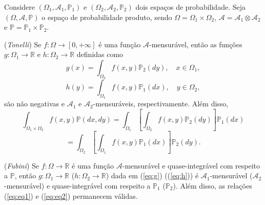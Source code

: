 \begin{theorem}
	Considere $(\Omega_1, \mathcal{A}_1, \mathbb{P}_1)$ e $(\Omega_2, \mathcal{A}_2, \mathbb{P}_2)$ dois espaços de probabilidade. Seja $(\Omega, \mathcal{A}, \mathbb{P})$ o espaço de probabilidade produto, sendo $\Omega = \Omega_1 \times \Omega_2$, $\mathcal{A} = \mathcal{A}_1 \otimes \mathcal{A}_2$ e $\mathbb{P} = \mathbb{P}_1 \times \mathbb{P}_2$.
	
	\begin{outline}
		\1[(a)](\textit{Tonelli}) Se $f : \Omega \rightarrow [0, +\infty]$ é uma função $\mathcal{A}$-mensurável, então as funções $g : \Omega_1 \rightarrow \mathbb{R}$ e $h : \Omega_2 \rightarrow \mathbb{R}$ definidas como
		\begin{equation}\label{eq:g}
			g(x) = \int_{\Omega_2} f(x, y)\mathbb{P}_2(dy), \quad x \in \Omega_1,
		\end{equation}
		\begin{equation}\label{eq:h}
			h(y) = \int_{\Omega_1} f(x, y)\mathbb{P}_1(dx), \quad y \in \Omega_2,
		\end{equation}
		são não negativas e $\mathcal{A}_1$ e $\mathcal{A}_2$-mensuráveis, respectivamente. Além disso,
		\begin{equation}\label{eq:eq1}
			\int_{\Omega_1 \times \Omega_2} f(x, y)\mathbb{P}(dx, dy) = \int_{\Omega_1} \left[\int_{\Omega_2} f(x, y) \mathbb{P}_2(dy)\right] \mathbb{P}_1(dx)
		\end{equation}
		\begin{equation}\label{eq:eq2}
			= \int_{\Omega_2} \left[\int_{\Omega_1} f(x, y)\mathbb{P}_1(dx)\right] \mathbb{P}_2(dy).
		\end{equation}
		
		\1[(b)] (\textit{Fubini}) Se $f : \Omega \rightarrow \mathbb{R}$ é uma função $\mathcal{A}$-mensurável e quase-integrável com respeito a $\mathbb{P}$, então $g : \Omega_1 \rightarrow \mathbb{R}$ ($h : \Omega_2 \rightarrow \mathbb{R}$) dada em (\ref{eq:g}) ((\ref{eq:h})) é $\mathcal{A}_1$-mensurável ($\mathcal{A}_2$-mensurável) e quase-integrável com respeito a $\mathbb{P}_1$ ($\mathbb{P}_2$). Além disso, as relações (\ref{eq:eq1}) e (\ref{eq:eq2}) permanecem válidas.
	\end{outline}
\end{theorem}

